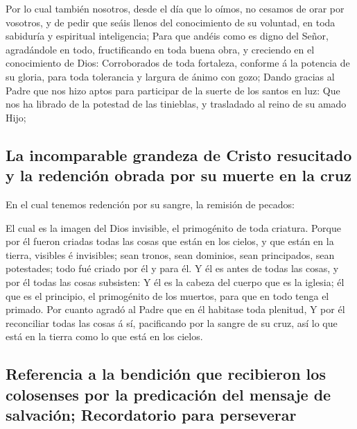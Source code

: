  Por lo cual también nosotros, desde el día que lo oímos, no
cesamos de orar por vosotros, y de pedir que seáis llenos del
conocimiento de su voluntad, en toda sabiduría y espiritual
inteligencia;  Para que andéis como es digno del Señor,
agradándole en todo, fructificando en toda buena obra, y creciendo en el
conocimiento de Dios:  Corroborados de toda fortaleza,
conforme á la potencia de su gloria, para toda tolerancia y largura de
ánimo con gozo;  Dando gracias al Padre que nos hizo aptos
para participar de la suerte de los santos en luz:  Que nos
ha librado de la potestad de las tinieblas, y trasladado al reino de su
amado Hijo;

\hypertarget{la-incomparable-grandeza-de-cristo-resucitado-y-la-redenciuxf3n-obrada-por-su-muerte-en-la-cruz}{%
\subsection{La incomparable grandeza de Cristo resucitado y la redención
obrada por su muerte en la
cruz}\label{la-incomparable-grandeza-de-cristo-resucitado-y-la-redenciuxf3n-obrada-por-su-muerte-en-la-cruz}}

 En el cual tenemos redención por su sangre, la remisión de
pecados:

 El cual es la imagen del Dios invisible, el primogénito de
toda criatura.  Porque por él fueron criadas todas las
cosas que están en los cielos, y que están en la tierra, visibles é
invisibles; sean tronos, sean dominios, sean principados, sean
potestades; todo fué criado por él y para él.  Y él es
antes de todas las cosas, y por él todas las cosas subsisten:
 Y él es la cabeza del cuerpo que es la iglesia; él que es
el principio, el primogénito de los muertos, para que en todo tenga el
primado.  Por cuanto agradó al Padre que en él habitase
toda plenitud,  Y por él reconciliar todas las cosas á sí,
pacificando por la sangre de su cruz, así lo que está en la tierra como
lo que está en los cielos.

\hypertarget{referencia-a-la-bendiciuxf3n-que-recibieron-los-colosenses-por-la-predicaciuxf3n-del-mensaje-de-salvaciuxf3n-recordatorio-para-perseverar}{%
\subsection{Referencia a la bendición que recibieron los colosenses por
la predicación del mensaje de salvación; Recordatorio para
perseverar}\label{referencia-a-la-bendiciuxf3n-que-recibieron-los-colosenses-por-la-predicaciuxf3n-del-mensaje-de-salvaciuxf3n-recordatorio-para-perseverar}}

